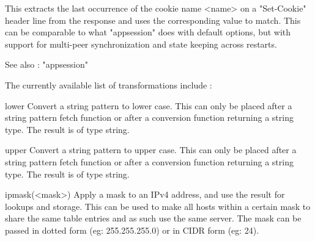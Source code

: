                This extracts the last occurrence of the cookie name <name> on a
               "Set-Cookie" header line from the response and uses the
               corresponding value to match. This can be comparable to what
               "appsession" does with default options, but with support for
                multi-peer synchronization and state keeping across restarts.

               See also : "appsession"


The currently available list of transformations include :

  lower        Convert a string pattern to lower case. This can only be placed
               after a string pattern fetch function or after a conversion
               function returning a string type. The result is of type string.

  upper        Convert a string pattern to upper case. This can only be placed
               after a string pattern fetch function or after a conversion
               function returning a string type. The result is of type string.

  ipmask(<mask>) Apply a mask to an IPv4 address, and use the result for lookups
               and storage. This can be used to make all hosts within a
               certain mask to share the same table entries and as such use
               the same server. The mask can be passed in dotted form (eg:
               255.255.255.0) or in CIDR form (eg: 24).